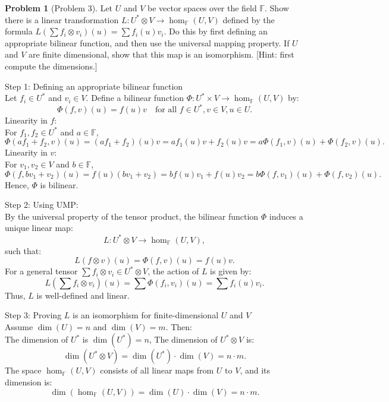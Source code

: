 \documentclass[12pt]{article}
\theoremstyle{definition}
\newtheorem{problem}{Problem}
\begin{document}
\begin{problem}[Problem 3]
    Let $U$ and $V$ be vector spaces over the field $\mathbb{F}$. Show there is a linear 
    transformation $L: U^* \otimes V \longrightarrow \hom_{\mathbb{F}}(U, V)$ defined by the
    formula $L(\sum f_i \otimes v_i)(u) = \sum f_i(u)v_i$. Do this by first defining an appropriate
    bilinear function, and then use the universal mapping property. If $U$ and $V$ are finite dimensional,
    show that this map is an isomorphism. [Hint: first compute the dimensions.]
    
    \begin{solution}
        Step 1: Defining an appropriate bilinear function\\
        Let \( f_i \in U^* \) and \( v_i \in V \). Define a bilinear function \( \Phi: U^* \times V \to \hom_\mathbb{F}(U, V) \) by:
        \[
        \Phi(f, v)(u) = f(u) v \quad \text{for all } f \in U^*, v \in V, u \in U.
        \]
        Linearity in \( f \):\\
        For \( f_1, f_2 \in U^* \) and \( a \in \mathbb{F} \),
        \[
        \Phi(af_1 + f_2, v)(u) = (af_1 + f_2)(u)v = a f_1(u)v + f_2(u)v = a\Phi(f_1, v)(u) + \Phi(f_2, v)(u).
        \]
        Linearity in \( v \):\\
        For \( v_1, v_2 \in V \) and \( b \in \mathbb{F} \),
        \[
        \Phi(f, bv_1 + v_2)(u) = f(u)(bv_1 + v_2) = bf(u)v_1 + f(u)v_2 = b\Phi(f, v_1)(u) + \Phi(f, v_2)(u).
        \]
        Hence, \( \Phi \) is bilinear.

        Step 2: Using UMP:\\
        By the universal property of the tensor product, the bilinear function \( \Phi \) induces a unique linear map:
        \[
        L: U^* \otimes V \to \hom_\mathbb{F}(U, V),
        \]
        such that:
        \[
        L(f \otimes v)(u) = \Phi(f, v)(u) = f(u) v.
        \]
        For a general tensor \( \sum f_i \otimes v_i \in U^* \otimes V \), the action of \( L \) is given by:
        \[
        L\left(\sum f_i \otimes v_i\right)(u) = \sum \Phi(f_i, v_i)(u) = \sum f_i(u)v_i.
        \]
        Thus, \( L \) is well-defined and linear.

        Step 3: Proving \( L \) is an isomorphism for finite-dimensional \( U \) and \( V \)\\
        Assume \( \dim(U) = n \) and \( \dim(V) = m \). Then:\\
        The dimension of \( U^* \) is \( \dim(U^*) = n \),
        The dimension of \( U^* \otimes V \) is:
        \[
        \dim(U^* \otimes V) = \dim(U^*) \cdot \dim(V) = n \cdot m.
        \]
        The space \( \hom_\mathbb{F}(U, V) \) consists of all linear maps from \( U \) to \( V \), and its dimension is:
        \[
        \dim(\hom_\mathbb{F}(U, V)) = \dim(U) \cdot \dim(V) = n \cdot m.
        \]


\end{solution}
\end{problem}
\end{document}
